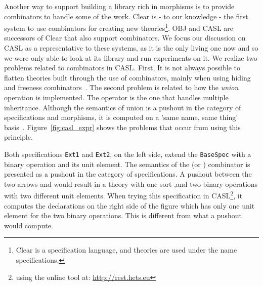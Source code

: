 
Another way to support building a library rich in morphisms is to provide combinators to handle some of the work. Clear is - to our knowledge - the first system to use combinators for creating new theories\footnote{Clear is a specification language, and theories are used under the name specifications.}. OBJ and CASL are successors of Clear that also support combinators. We focus our discussion on CASL as a representative to these systems, as it is the only living one now and so we were only able to look at its library and run experiments on it. 
We realize two problems related to combinators in CASL. First, It is not always possible to flatten theories built through the use of combinators, mainly when using hiding and freeness combinators~\cite{CoFI:2004:CASL-RM}. The second problem is related to how the \emph{union} operation is implemented. The  operator is the one that handles multiple inheritance. Although the semantics of union is a pushout in the category of specifications and morphisms, it is computed on a 'same name, same thing' basis~\cite{bidoit2003casl}. Figure~\ref{fig:casl_expr} shows the problems that occur from using this principle. 
\begin{figure}

\end{figure}
Both specifications \verb|Ext1| and \verb|Ext2|, on the left side, extend the \verb|BaseSpec| with a binary operation and its unit element. The semantics of the  (or ) combinator is presented as a pushout in the category of specifications. A pushout between the two arrows  and  would result in a theory with one sort ,and  two binary operations with two different unit elements. When trying this specification in CASL\footnote{using the online tool at: \url{http://rest.hets.eu}}, it computes the declarations on the right side of the figure which has only one unit element for the two binary operations. This is different from what a pushout would compute. 


